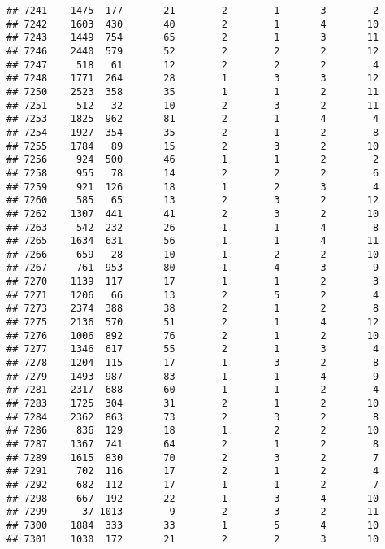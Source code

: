 \documentclass[]{article}
\begin{document}
\begin{verbatim}
## 7241    1475  177       21        2        1       3        2
## 7242    1603  430       40        2        1       4       10
## 7243    1449  754       65        2        1       3       11
## 7246    2440  579       52        2        2       2       12
## 7247     518   61       12        2        2       2        4
## 7248    1771  264       28        1        3       3       12
## 7250    2523  358       35        1        1       2       11
## 7251     512   32       10        2        3       2       11
## 7253    1825  962       81        2        1       4        4
## 7254    1927  354       35        2        1       2        8
## 7255    1784   89       15        2        3       2       10
## 7256     924  500       46        1        1       2        2
## 7258     955   78       14        2        2       2        6
## 7259     921  126       18        1        2       3        4
## 7260     585   65       13        2        3       2       12
## 7262    1307  441       41        2        3       2       10
## 7263     542  232       26        1        1       4        8
## 7265    1634  631       56        1        1       4       11
## 7266     659   28       10        1        2       2       10
## 7267     761  953       80        1        4       3        9
## 7270    1139  117       17        1        1       2        3
## 7271    1206   66       13        2        5       2        4
## 7273    2374  388       38        2        1       2        8
## 7275    2136  570       51        2        1       4       12
## 7276    1006  892       76        2        1       2       10
## 7277    1346  617       55        2        1       3        4
## 7278    1204  115       17        1        3       2        8
## 7279    1493  987       83        1        1       4        9
## 7281    2317  688       60        1        1       2        4
## 7283    1725  304       31        2        1       2       10
## 7284    2362  863       73        2        3       2        8
## 7286     836  129       18        1        2       2       10
## 7287    1367  741       64        2        1       2        8
## 7289    1615  830       70        2        3       2        7
## 7291     702  116       17        2        1       2        4
## 7292     682  112       17        1        1       2        7
## 7298     667  192       22        1        3       4       10
## 7299      37 1013        9        2        3       2       11
## 7300    1884  333       33        1        5       4       10
## 7301    1030  172       21        2        2       3       10

\end{verbatim}
\end{document}
